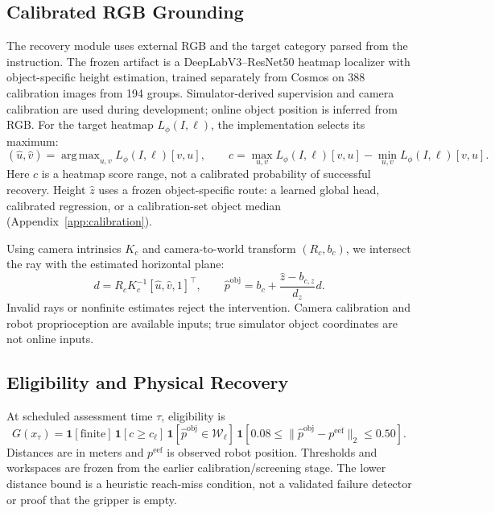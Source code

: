 \documentclass{article}
\newcommand{\ind}{\mathbf{1}}
\DeclareMathOperator*{\argmax}{arg\,max}
\begin{document}
\subsection{Calibrated RGB Grounding}
\label{sec:grounding}
The recovery module uses external RGB and the target category parsed
from the instruction. The frozen artifact is a DeepLabV3--ResNet50 heatmap
localizer with object-specific height estimation, trained separately from
Cosmos on 388 calibration images from 194 groups.
Simulator-derived supervision and camera calibration are used during
development; online object position is inferred from RGB.
For the target heatmap $L_\phi(I,\ell)$, the implementation selects its maximum:
\begin{equation}
(\hat u,\hat v)=\argmax_{u,v}L_\phi(I,\ell)[v,u],\qquad
c=\max_{u,v}L_\phi(I,\ell)[v,u]-\min_{u,v}L_\phi(I,\ell)[v,u].
\label{eq:heatmap}
\end{equation}
Here $c$ is a heatmap score range, not a calibrated probability of successful
recovery. Height $\hat z$ uses a frozen object-specific route: a learned
global head, calibrated regression, or a calibration-set object median
(Appendix~\ref{app:calibration}).

Using camera intrinsics $K_c$ and camera-to-world transform $(R_c,b_c)$,
we intersect the ray with the estimated horizontal plane:
\begin{equation}
d=R_cK_c^{-1}[\hat u,\hat v,1]^\top,\qquad
\hat p^{\mathrm{obj}}=b_c+
\frac{\hat z-b_{c,z}}{d_z}d.
\label{eq:projection}
\end{equation}
Invalid rays or nonfinite estimates reject the intervention.
Camera calibration and robot proprioception are available inputs; true
simulator object coordinates are not online inputs.

\subsection{Eligibility and Physical Recovery}
At scheduled assessment time $\tau$, eligibility is
\begin{equation}
G(x_\tau)=
\ind[\mathrm{finite}]\,
\ind[c\ge c_\ell]\,
\ind[\hat p^{\mathrm{obj}}\in\mathcal W_\ell]\,
\ind[0.08\le \|\hat p^{\mathrm{obj}}-p^{\mathrm{eef}}\|_2\le0.50].
\label{eq:gate}
\end{equation}
Distances are in meters and $p^{\mathrm{eef}}$ is observed robot position.
Thresholds and workspaces are frozen from the earlier calibration/screening
stage. The lower distance bound is a heuristic reach-miss condition, not
a validated failure detector or proof that the gripper is empty.
\end{document}
